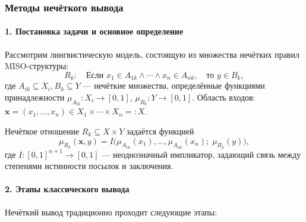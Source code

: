 \subsubsection{Методы нечёткого вывода}

\paragraph{1. Постановка задачи и основное определение}
Рассмотрим лингвистическую модель, состоящую из множества нечётких правил MISO-структуры:
\begin{equation}
  R_k:\quad
  \text{Если }x_1\in A_{1k}\wedge\cdots\wedge x_n\in A_{nk},\quad
  \text{то }y\in B_k,
  \label{eq:rule_general}
\end{equation}
где $A_{ik}\subseteq X_i, B_k\subseteq Y$ — нечёткие множества,
определённые функциями принадлежности
$\mu_{A_{ik}}:X_i\to[0,1]$, $\mu_{B_k}:Y\to[0,1]$.
Область входов: $\mathbf{x}=(x_1,\dots,x_n)\in X_1\times\cdots\times X_n=:X$.

\begin{definition}
Нечёткое отношение $R_k\subseteq X\times Y$ задаётся функцией
$$
  \mu_{R_k}(\mathbf{x},y)
  = I\bigl(\mu_{A_{1k}}(x_1),\dots,\mu_{A_{nk}}(x_n);\;\mu_{B_k}(y)\bigr),
$$
где $I:[0,1]^{n+1}\to[0,1]$ — неоднозначный импликатор, задающий связь
между степенями истинности посылок и заключения.
\end{definition}

\paragraph{2. Этапы классического вывода}
Нечёткий вывод традиционно проходит следующие этапы:

